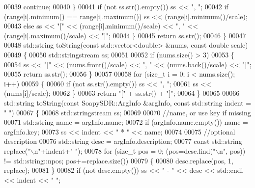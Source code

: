\begin{DoxyCode}
00039             \textcolor{keywordflow}{continue};
00040         \}
00041         \textcolor{keywordflow}{if} (not ss.str().empty()) ss << \textcolor{stringliteral}{", "};
00042         \textcolor{keywordflow}{if} (range[i].minimum() == range[i].maximum()) ss << (range[i].minimum()/scale);
00043         \textcolor{keywordflow}{else} ss << \textcolor{stringliteral}{"["} << (range[i].minimum()/scale) << \textcolor{stringliteral}{", "} << (range[i].maximum()/scale) << \textcolor{stringliteral}{"]"};
00044     \}
00045     \textcolor{keywordflow}{return} ss.str();
00046 \}
00047 
00048 std::string toString(\textcolor{keyword}{const} std::vector<double> &nums, \textcolor{keyword}{const} \textcolor{keywordtype}{double} scale)
00049 \{
00050     std::stringstream ss;
00051 
00052     \textcolor{keywordflow}{if} (nums.size() > 3)
00053     \{
00054         ss << \textcolor{stringliteral}{"["} << (nums.front()/scale) << \textcolor{stringliteral}{", "} << (nums.back()/scale) << \textcolor{stringliteral}{"]"};
00055         \textcolor{keywordflow}{return} ss.str();
00056     \}
00057 
00058     \textcolor{keywordflow}{for} (\textcolor{keywordtype}{size\_t} i = 0; i < nums.size(); i++)
00059     \{
00060         \textcolor{keywordflow}{if} (not ss.str().empty()) ss << \textcolor{stringliteral}{", "};
00061         ss << (nums[i]/scale);
00062     \}
00063     \textcolor{keywordflow}{return} \textcolor{stringliteral}{"["} + ss.str() + \textcolor{stringliteral}{"]"};
00064 \}
00065 
00066 std::string toString(\textcolor{keyword}{const} SoapySDR::ArgInfo &argInfo, \textcolor{keyword}{const} std::string indent = \textcolor{stringliteral}{"    "})
00067 \{
00068     std::stringstream ss;
00069 
00070     \textcolor{comment}{//name, or use key if missing}
00071     std::string name = argInfo.name;
00072     \textcolor{keywordflow}{if} (argInfo.name.empty()) name = argInfo.key;
00073     ss << indent << \textcolor{stringliteral}{" * "} << name;
00074 
00075     \textcolor{comment}{//optional description}
00076     std::string desc = argInfo.description;
00077     \textcolor{keyword}{const} std::string replace(\textcolor{stringliteral}{"\(\backslash\)n"}+indent+\textcolor{stringliteral}{"   "});
00078     \textcolor{keywordflow}{for} (\textcolor{keywordtype}{size\_t} pos = 0; (pos=desc.find(\textcolor{stringliteral}{"\(\backslash\)n"}, pos)) != std::string::npos; pos+=replace.size())
00079     \{
00080         desc.replace(pos, 1, replace);
00081     \}
00082     \textcolor{keywordflow}{if} (not desc.empty()) ss << \textcolor{stringliteral}{" - "} << desc << std::endl << indent << \textcolor{stringliteral}{"  "};

\end{DoxyCode}
